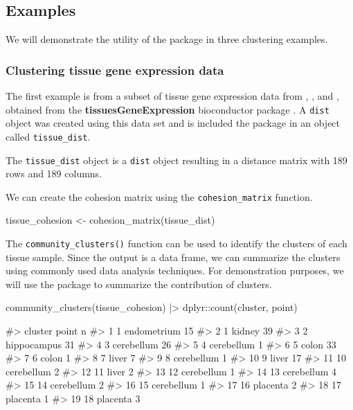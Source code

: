 \hypertarget{examples}{%
\subsection{Examples}\label{examples}}

We will demonstrate the utility of the  package in three
clustering examples.

\hypertarget{clustering-tissue-gene-expression-data}{%
\subsubsection{Clustering tissue gene expression
data}\label{clustering-tissue-gene-expression-data}}

The first example is from a subset of tissue gene expression data from
\citet{zilliox2007gene}, \citet{mccall2011gene}, and
\citet{mccall2014gene}, obtained from the \textbf{tissuesGeneExpression}
bioconductor package \citep{tissue}. A \texttt{dist} object was created
using this data set and is included the  package in an
object called \texttt{tissue\_dist}.

The \texttt{tissue\_dist} object is a \texttt{dist} object resulting in
a distance matrix with 189 rows and 189 columns.

We can create the cohesion matrix using the \texttt{cohesion\_matrix}
function.

\begin{Schunk}
\begin{Sinput}
tissue_cohesion <- cohesion_matrix(tissue_dist)
\end{Sinput}
\end{Schunk}

The \texttt{community\_clusters()} function can be used to identify the
clusters of each tissue sample. Since the output is a data frame, we can
summarize the clusters using commonly used data analysis techniques. For
demonstration purposes, we will use the  package to
summarize the contribution of clusters.

\begin{Schunk}
\begin{Sinput}
community_clusters(tissue_cohesion) |>
  dplyr::count(cluster, point)
\end{Sinput}
\begin{Soutput}
#>    cluster       point  n
#> 1        1 endometrium 15
#> 2        1      kidney 39
#> 3        2 hippocampus 31
#> 4        3  cerebellum 26
#> 5        4  cerebellum  1
#> 6        5       colon 33
#> 7        6       colon  1
#> 8        7       liver  7
#> 9        8  cerebellum  1
#> 10       9       liver 17
#> 11      10  cerebellum  2
#> 12      11       liver  2
#> 13      12  cerebellum  1
#> 14      13  cerebellum  4
#> 15      14  cerebellum  2
#> 16      15  cerebellum  1
#> 17      16    placenta  2
#> 18      17    placenta  1
#> 19      18    placenta  3
\end{Soutput}
\end{Schunk}

